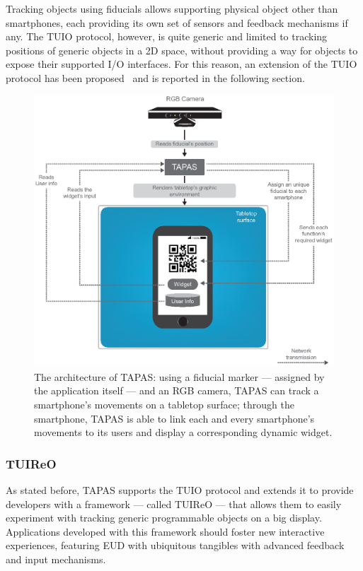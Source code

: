 Tracking objects using fiducials allows supporting physical object other than smartphones, each providing its own set of sensors and feedback mechanisms if any. The \ac{TUIO} protocol, however, is quite generic and limited to tracking positions of generic objects in a 2D space, without providing a way for objects to expose their supported I/O interfaces. For this reason, an extension of the \ac{TUIO} protocol has been proposed~\cite{malizia2017block} and is reported in the following section.

\begin{figure}[ht!]
\centering
\includegraphics[width=\textwidth]{images/c4/TAPAS.eps}
\caption{The architecture of \ac{TAPAS}: using a fiducial marker --- assigned by the application itself --- and an RGB camera, \ac{TAPAS} can track a smartphone's movements on a tabletop surface; through the smartphone, \ac{TAPAS} is able to link each and every smartphone's movements to its users and display a corresponding dynamic widget.}\label{fig:arch}
\end{figure}

\subsubsection{\ac{TUIReO}}
As stated before, \ac{TAPAS} supports the \ac{TUIO} protocol and extends it to provide developers with a framework --- called \ac{TUIReO} --- that allows them to easily experiment with tracking generic programmable objects on a big display. Applications developed with this framework should foster new interactive experiences, featuring \ac{EUD} with ubiquitous tangibles with advanced feedback and input mechanisms.

